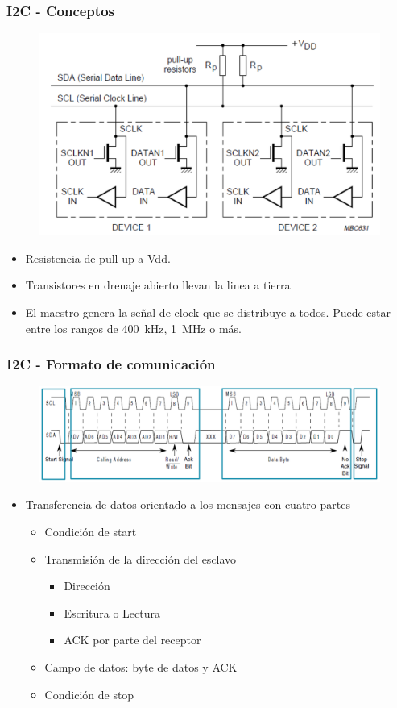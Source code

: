 \documentclass[10.5pt,scale=1.0,t,aspectratio=169,hyperref={pdfpagelabels=false}]{beamer}
\begin{document}
\begin{frame}
	\frametitle{I2C - Conceptos}
	{\small
		\begin{figure}
			\centering
			\includegraphics[scale=0.4]{22_I2CBus2}
		\end{figure}
		\begin{itemize}
			\item Resistencia de pull-up a Vdd.
			\item Transistores en drenaje abierto llevan la linea a tierra
			\item El maestro genera la señal de clock que se distribuye a todos. Puede estar entre los rangos de \SI{400}{\kilo\hertz}, \SI{1}{\mega\hertz} o más. 
		\end{itemize}
	}
\end{frame}
\begin{frame}
	\frametitle{I2C - Formato de comunicación}
	{\small
		\begin{figure}
			\centering
			\includegraphics[scale=0.3]{23_I2CFormat}
		\end{figure}
		\begin{itemize}
			\item Transferencia de datos orientado a los mensajes con cuatro partes
			\begin{itemize}
				\item Condición de start
				\item Transmisión de la dirección del esclavo
				\begin{itemize}
					\item Dirección
					\item Escritura o Lectura
					\item ACK por parte del receptor
				\end{itemize}
				\item Campo de datos: byte de datos y ACK
				\item Condición de stop
			\end{itemize}
		\end{itemize}
	}
\end{frame}
\end{document}
